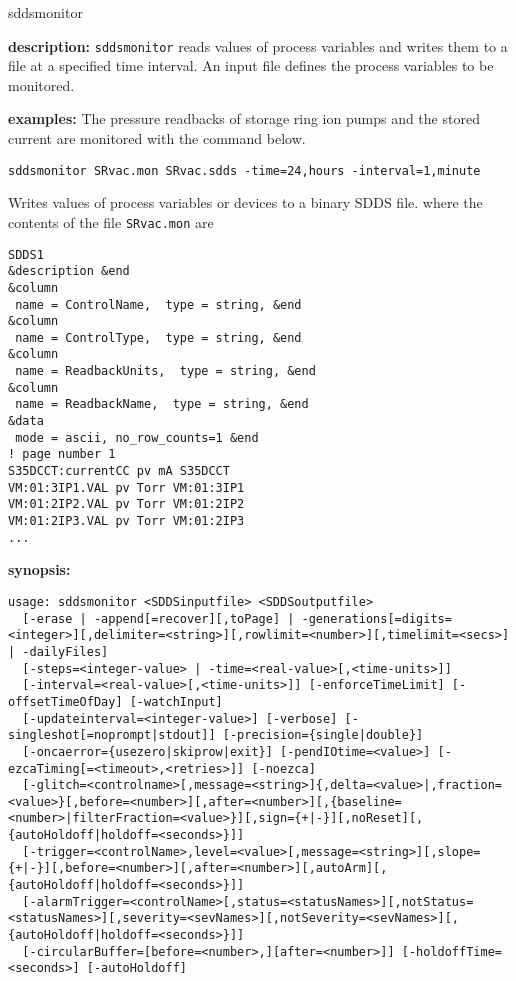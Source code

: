 \begin{sddsprog}{sddsmonitor}
\item \textbf{description:}
\verb+sddsmonitor+ reads values of process variables and writes them to a file at a specified time interval.
An input file defines the process variables to be monitored.
\item \textbf{examples:}
The pressure readbacks of storage ring ion pumps and the stored current are monitored
with the command below.
\begin{verbatim}
sddsmonitor SRvac.mon SRvac.sdds -time=24,hours -interval=1,minute
\end{verbatim}
Writes values of process variables or devices to a binary SDDS file.
where the contents of the file \verb+SRvac.mon+ are
\begin{verbatim}
SDDS1
&description &end
&column
 name = ControlName,  type = string, &end
&column
 name = ControlType,  type = string, &end
&column
 name = ReadbackUnits,  type = string, &end
&column
 name = ReadbackName,  type = string, &end
&data
 mode = ascii, no_row_counts=1 &end
! page number 1
S35DCCT:currentCC pv mA S35DCCT
VM:01:3IP1.VAL pv Torr VM:01:3IP1
VM:01:2IP2.VAL pv Torr VM:01:2IP2
VM:01:2IP3.VAL pv Torr VM:01:2IP3
...
\end{verbatim}
\item \textbf{synopsis:}
\begin{verbatim}
usage: sddsmonitor <SDDSinputfile> <SDDSoutputfile>
  [-erase | -append[=recover][,toPage] | -generations[=digits=<integer>][,delimiter=<string>][,rowlimit=<number>][,timelimit=<secs>] | -dailyFiles]
  [-steps=<integer-value> | -time=<real-value>[,<time-units>]]
  [-interval=<real-value>[,<time-units>]] [-enforceTimeLimit] [-offsetTimeOfDay] [-watchInput]
  [-updateinterval=<integer-value>] [-verbose] [-singleshot[=noprompt|stdout]] [-precision={single|double}]
  [-oncaerror={usezero|skiprow|exit}] [-pendIOtime=<value>] [-ezcaTiming[=<timeout>,<retries>]] [-noezca]
  [-glitch=<controlname>[,message=<string>]{,delta=<value>|,fraction=<value>}[,before=<number>][,after=<number>][,{baseline=<number>|filterFraction=<value>}][,sign={+|-}][,noReset][,{autoHoldoff|holdoff=<seconds>}]]
  [-trigger=<controlName>,level=<value>[,message=<string>][,slope={+|-}][,before=<number>][,after=<number>][,autoArm][,{autoHoldoff|holdoff=<seconds>}]]
  [-alarmTrigger=<controlName>[,status=<statusNames>][,notStatus=<statusNames>][,severity=<sevNames>][,notSeverity=<sevNames>][,{autoHoldoff|holdoff=<seconds>}]]
  [-circularBuffer=[before=<number>,][after=<number>]] [-holdoffTime=<seconds>] [-autoHoldoff]

\end{verbatim}
\end{sddsprog}
